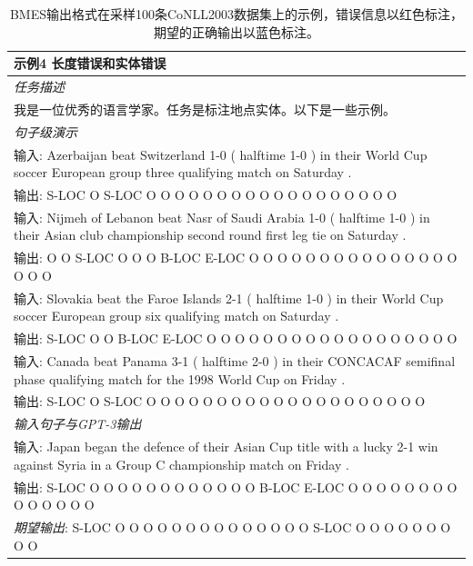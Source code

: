 \documentclass[supercite]{Experimental_Report}
\theoremstyle{definition}
\begin{document}
\begin{table}[th!]
{\begin{tabular}{l}
\textbf{示例4 {\color{red} 长度错误和实体错误}} \\\midrule
\textit{任务描述} \\
我是一位优秀的语言学家。任务是标注地点实体。以下是一些示例。 \\\midrule
\textit{句子级演示} \\
输入: Azerbaijan beat Switzerland 1-0 ( halftime 1-0 ) in their World Cup soccer European group three qualifying match on Saturday . \\
输出: S-LOC O S-LOC O O O O O O O O O O O O O O O O O O \\
输入: Nijmeh of Lebanon beat Nasr of Saudi Arabia 1-0 ( halftime 1-0 ) in their Asian club championship second round first leg tie on Saturday . \\
输出: O O S-LOC O O O B-LOC E-LOC O O O O O O O O O O O O O O O O O O \\
输入: Slovakia beat the Faroe Islands 2-1 ( halftime 1-0 ) in their World Cup soccer European group six qualifying match on Saturday . \\
输出: S-LOC O O B-LOC E-LOC O O O O O O O O O O O O O O O O O O \\
输入: Canada beat Panama 3-1 ( halftime 2-0 ) in their CONCACAF semifinal phase qualifying match for the 1998 World Cup on Friday . \\
输出: S-LOC O S-LOC O O O O O O O O O O O O O O O O O O O O \\\midrule
\textit{输入句子与GPT-3输出} \\
输入: Japan began the defence of their Asian Cup title with a lucky 2-1 win against Syria in a Group C championship match on Friday . \\
输出: S-LOC O O O O O O O O O O O O B-LOC E-LOC O O O O O O O O O O O O O O \\
{\color{blue}\it 期望输出}: S-LOC O O O O O O O O O O O O O O S-LOC O O O O O O O O O \\\bottomrule
    \end{tabular}
    }
     \caption{BMES输出格式在采样100条CoNLL2003数据集上的示例，错误信息以红色标注，期望的正确输出以蓝色标注。}
    \label{tab:bmes_format}
\end{table}
\end{document}
